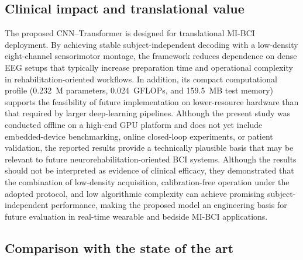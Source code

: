 \documentclass[a4paper,fleqn]{cas-dc}
\begin{document}
\subsection{Clinical impact and translational value}
\label{subsec:clinical_impact}

The proposed CNN–Transformer is designed for translational MI-BCI deployment. By achieving stable subject-independent decoding with a low-density eight-channel sensorimotor montage, the framework reduces dependence on dense EEG setups that typically increase preparation time and operational complexity in rehabilitation-oriented workflows. In addition, its compact computational profile (0.232~M parameters, 0.024~GFLOPs, and 159.5~MB test memory) supports the feasibility of future implementation on lower-resource hardware than that required by larger deep-learning pipelines. Although the present study was conducted offline on a high-end GPU platform and does not yet include embedded-device benchmarking, online closed-loop experiments, or patient validation, the reported results provide a technically plausible basis that may be relevant to future neurorehabilitation-oriented BCI systems. Although the results should not be interpreted as evidence of clinical efficacy, they demonstrated that the combination of low-density acquisition, calibration-free operation under the adopted protocol, and low algorithmic complexity can achieve promising subject-independent performance, making the proposed model an engineering basis for future evaluation in real-time wearable and bedside MI-BCI applications.

\subsection{Comparison with the state of the art}
\end{document}
